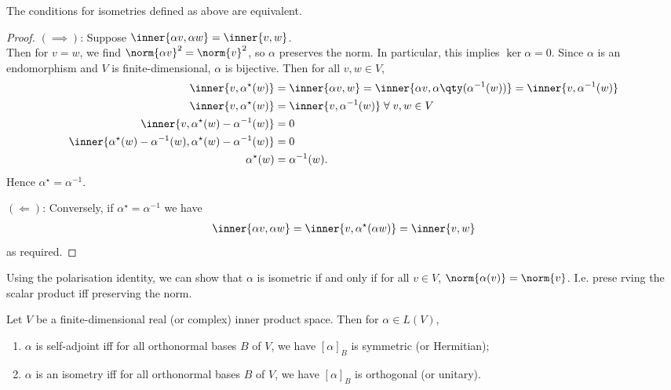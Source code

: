 \begin{proposition}
	The conditions for isometries defined as above are equivalent.
\end{proposition}

\begin{proof}
	$(\implies)$: Suppose $\inner{\alpha v, \alpha w} = \inner{v,w}$. \\
	Then for $v = w$, we find $\norm{\alpha v}^2 = \norm{v}^2$, so $\alpha$ preserves the norm.
	In particular, this implies $\ker \alpha = \qty{0}$.
	Since $\alpha$ is an endomorphism and $V$ is finite-dimensional, $\alpha$ is bijective.
	Then for all $v, w \in V$,
	\begin{align*}
		\inner{v, \alpha^\star(w)} &= \inner{\alpha v, w} = \inner{\alpha v, \alpha\qty(\alpha^{-1}(w))} = \inner{v, \alpha^{-1}(w)} \\
		\inner{v, \alpha^\star(w)} &= \inner{v, \alpha^{-1}(w)} \; \forall \; v, w \in V \\
		\inner{v, \alpha^\star(w) - \alpha^{-1}(w)} &= 0 \\
		\inner{\alpha^\star(w) - \alpha^{-1}(w), \alpha^\star(w) - \alpha^{-1}(w)} &= 0 \\
		\alpha^\star(w) &= \alpha^{-1}(w).
	\end{align*}
	Hence $\alpha^\star = \alpha^{-1}$.

	$(\Longleftarrow)$: Conversely, if $\alpha^\star = \alpha^{-1}$ we have
	\begin{align*}
		\inner{\alpha v, \alpha w} = \inner{v, \alpha^\star(\alpha w)} = \inner{v, w}
	\end{align*}
	as required.
\end{proof}

\begin{remark}
	Using the polarisation identity, we can show that $\alpha$ is isometric if and only if for all $v \in V$, $\norm{\alpha(v)} = \norm{v}$.
	I.e. prese
	rving the scalar product iff preserving the norm.
\end{remark}
\begin{lemma}
	Let $V$ be a finite-dimensional real (or complex) inner product space.
	Then for $\alpha \in L(V)$,
	\begin{enumerate}
		\item $\alpha$ is self-adjoint iff for all orthonormal bases $B$ of $V$, we have $[\alpha]_B$ is symmetric (or Hermitian);
		\item $\alpha$ is an isometry iff for all orthonormal bases $B$ of $V$, we have $[\alpha]_B$ is orthogonal (or unitary).
	\end{enumerate}
\end{lemma}

